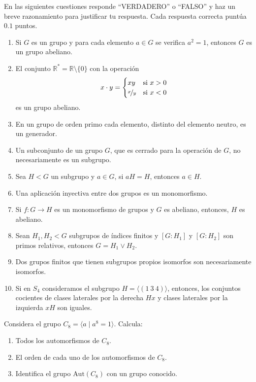 \documentclass[12pt]{article}
\begin{document}
    \begin{ejercicio}[1 punto]
        En las siguientes cuestiones responde ``VERDADERO'' o ``FALSO'' y haz un breve razonamiento para justificar tu respuesta. Cada respuesta correcta puntúa $0.1$ puntos.

        \begin{enumerate}
            \item Si $G$ es un grupo y para cada elemento $a \in G$ se verifica $a^2 = 1$, entonces $G$ es un grupo abeliano.
            \item El conjunto $\mathbb{R}^* = \mathbb{R} \setminus \{0\}$ con la operación 
            \[
            x \cdot y = \begin{cases} 
            xy & \text{si } x > 0 \\ 
            \nicefrac{x}{y} & \text{si } x < 0 
            \end{cases}
            \]
            es un grupo abeliano.
            \item En un grupo de orden primo cada elemento, distinto del elemento neutro, es un generador.
            \item Un subconjunto de un grupo $G$, que es cerrado para la operación de $G$, no necesariamente es un subgrupo.
            \item Sea $H < G$ un subgrupo y $a \in G$, si $aH = H$, entonces $a \in H$.
            \item Una aplicación inyectiva entre dos grupos es un monomorfismo.
            \item Si $f : G \to H$ es un monomorfismo de grupos y $G$ es abeliano, entonces, $H$ es abeliano.
            \item Sean $H_1, H_2 < G$ subgrupos de índices finitos y $[G : H_1]$ y $[G : H_2]$ son primos relativos, entonces $G = H_1 \vee H_2$.
            \item Dos grupos finitos que tienen subgrupos propios isomorfos son necesariamente isomorfos.
            \item Si en $S_4$ consideramos el subgrupo $H = \langle (1\ 3\ 4) \rangle$, entonces, los conjuntos cocientes de clases laterales por la derecha $Hx$ y clases laterales por la izquierda $xH$ son iguales.
        \end{enumerate}
    \end{ejercicio}

    \begin{ejercicio}[1 punto]
        Considera el grupo $C_8 = \langle a \mid a^8 = 1 \rangle$. Calcula:
        \begin{enumerate}
            \item Todos los automorfismos de $C_8$.
            \item El orden de cada uno de los automorfismos de $C_8$.
            \item Identifica el grupo $\text{Aut}(C_8)$ con un grupo conocido.
        \end{enumerate}
    \end{ejercicio}
\end{document}
